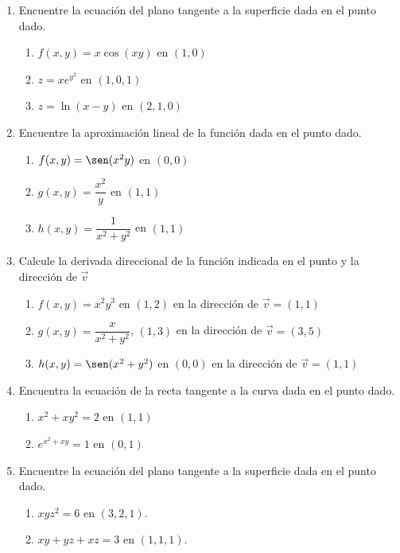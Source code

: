 \documentclass{article}
\begin{document}
\begin{enumerate}
  \vspace{2mm}
  \item Encuentre la ecuación del plano tangente a la superficie dada en el punto dado.
    \begin{enumerate}
      \item $f(x,y)=x\cos(xy)$ en $(1,0)$
      \item $z=xe^{y^2}$ en $(1,0,1)$
      \item $z=\ln(x-y)$ en $(2,1,0)$
    \end{enumerate}
  \vspace{2mm}
  \item Encuentre la aproximación lineal de la función dada en el punto dado.
    \begin{enumerate}
      \item $f(x,y)=\sen(x^2y)$ en $(0,0)$
      \item $g(x,y)=\dfrac{x^2}{y}$ en $(1,1)$
      \item $h(x,y)=\dfrac{1}{x^2+y^2}$ en $(1,1)$
    \end{enumerate}
  \vspace{2mm}
  \item Calcule la derivada direccional de la función indicada en el punto y la dirección de $\vec{v}$
    \begin{enumerate}
      \item $f(x,y)=x^2y^3$ en $(1,2)$ en la dirección de $\vec{v}=(1,1)$
      \item $g(x,y)=\dfrac{x}{x^2+y^2}$, $(1,3)$ en la dirección de $\vec{v}=(3,5)$
      \item $h(x,y)=\sen(x^2+y^2)$ en $(0,0)$ en la dirección de $\vec{v}=(1,1)$
    \end{enumerate}
  \vspace{2mm}
  \item Encuentra la ecuación de la recta tangente a la curva dada en el punto dado.
    \begin{enumerate}
      \item $x^2+xy^2=2$ en $(1,1)$
      \item $e^{x^2+xy}=1$ en $(0,1)$
    \end{enumerate}
  \vspace{2mm}
  \item Encuentre la ecuación del plano tangente a la superficie dada en el punto dado.
    \begin{enumerate}
      \item $xyz^2=6$ en $(3,2,1)$.
      \item $xy+yz+xz=3$ en $(1,1,1)$.

\end{enumerate}
\end{enumerate}
\end{document}
